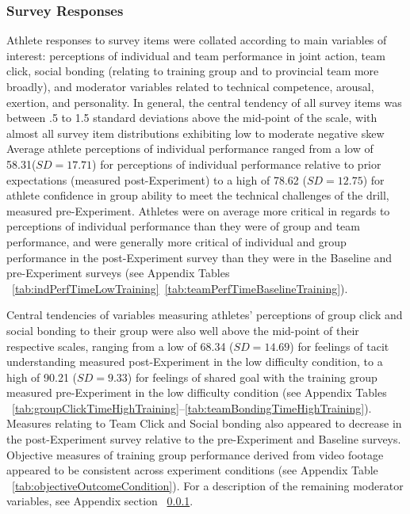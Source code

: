 \subsubsection{Survey Responses\label{sec:surveyResponses}}
Athlete responses to survey items were collated according to main variables of interest: perceptions of individual and team performance in joint action, team click, social bonding (relating to training group and to provincial team more broadly), and moderator variables related to technical competence, arousal, exertion, and personality. In general, the central tendency of all survey items was between .5 to 1.5 standard deviations above the mid-point of the scale, with almost all survey item distributions exhibiting low to moderate negative skew %
Average athlete perceptions of individual performance ranged from a low of 58.31($SD = 17.71$) for perceptions of individual performance relative to prior expectations (measured post-Experiment) to a high of 78.62 ($SD = 12.75$) for athlete confidence in group ability to meet the technical challenges of the drill, measured pre-Experiment.  Athletes were on average more critical in regards to perceptions of individual performance than they were of group and team performance, and were generally more critical of individual and group performance in the post-Experiment survey than they were in the Baseline and pre-Experiment surveys (see Appendix Tables ~\ref{tab:indPerfTimeLowTraining}\nobreakdash~\ref{tab:teamPerfTimeBaselineTraining}).

Central tendencies of variables measuring athletes' perceptions of group click and social bonding to their group were also well above the mid-point of their respective scales, ranging from a low of 68.34 ($SD = 14.69$) for feelings of tacit understanding measured post-Experiment in the low difficulty condition, to a high of 90.21 ($SD = 9.33$) for feelings of shared goal with the training group measured pre-Experiment in the low difficulty condition (see Appendix Tables ~\ref{tab:groupClickTimeHighTraining}\nobreakdash--\ref{tab:teamBondingTimeHighTraining}).
Measures relating to Team Click and Social bonding also appeared to decrease in the post-Experiment survey relative to the pre-Experiment and Baseline surveys.  Objective measures of training group performance derived from video footage appeared to be consistent across experiment conditions (see Appendix Table ~\ref{tab:objectiveOutcomeCondition}).
For a description of the remaining moderator variables, see Appendix section ~\ref{}.




